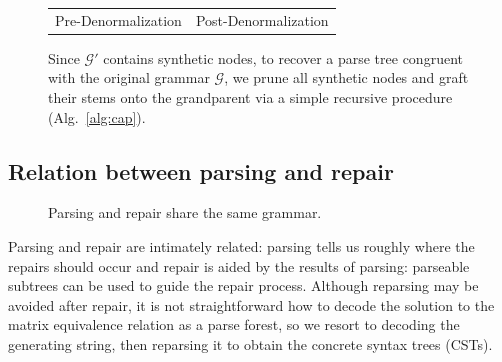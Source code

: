 \documentclass[sigplan,review,anonymous,acmsmall]{acmart}\settopmatter{printfolios=false,printccs=false,printacmref=false}
\begin{document}
\begin{figure}[H]
{\begin{tabular}{ll}
      \hspace{1cm}\Huge{Pre-Denormalization} & \hspace{2cm}\Huge{Post-Denormalization}
    \end{tabular}
  }
  \caption{Since $\mathcal{G}'$ contains synthetic nodes, to recover a parse tree congruent with the original grammar $\mathcal{G}$, we prune all synthetic nodes and graft their stems onto the grandparent via a simple recursive procedure (Alg.~\ref{alg:cap}).}%
\end{figure}

\subsection{Relation between parsing and repair}\label{sec:sat}

\begin{figure}
  \vspace{-15pt}
  \begin{center}\resizebox{0.45\textwidth}{!}{}\end{center}
  \caption{Parsing and repair share the same grammar.}
\end{figure}

Parsing and repair are intimately related: parsing tells us roughly where the repairs should occur and repair is aided by the results of parsing: parseable subtrees can be used to guide the repair process. Although reparsing may be avoided after repair, it is not straightforward how to decode the solution to the matrix equivalence relation as a parse forest, so we resort to decoding the generating string, then reparsing it to obtain the concrete syntax trees (CSTs).
\end{document}
